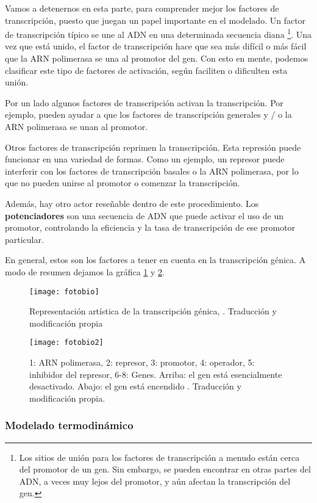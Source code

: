  Vamos a detenernos en esta parte, para comprender mejor los factores de transcripción, puesto que juegan un papel importante en el modelado.
  Un factor de transcripción típico se une al ADN en una determinada secuencia diana \footnote{Los sitios de unión para los factores de transcripción a menudo están cerca del promotor de un gen. Sin embargo, se pueden encontrar en otras partes del ADN, a veces muy lejos del promotor, y aún afectan la transcripción del gen.}. Una vez que está unido, el factor de transcripción hace que sea más difícil o más fácil que la ARN polimerasa se una al promotor del gen. Con esto en mente, podemos clasificar este tipo de factores de activación, según faciliten o dificulten esta unión.
 
 Por un lado algunos factores de transcripción activan la transcripción. Por ejemplo, pueden ayudar a que los factores de transcripción generales y / o la ARN polimerasa se unan al promotor.
 
 Otros factores de transcripción reprimen la transcripción. Esta represión puede funcionar en una variedad de formas. Como un ejemplo, un represor puede interferir con los factores de transcripción basales o la ARN polimerasa, por lo que no pueden unirse al promotor o comenzar la transcripción.
 
 Además, hay otro actor reseñable dentro de este procedimiento. Los \textbf{potenciadores} son una secuencia de ADN que puede activar el uso de un promotor, controlando la eficiencia y la tasa de transcripción de ese promotor particular.
 
 En general, estos son los factores a tener en cuenta en la transcripción génica. A modo de resumen dejamos la gráfica \ref{biologiafoto} y \ref{biofoto2}.
   \begin{figure}[h]
 	\texttt{[image: fotobio]}
 	\centering
 	\caption{Representación artística de la transcripción génica, \cite{wiki:foto_ts}. Traducción y modificación propia}
 	\label{biologiafoto}
 \end{figure}
    \begin{figure}[h]
 	\texttt{[image: fotobio2]}
 	\centering
 	\caption{1: ARN polimerasa, 2: represor, 3: promotor, 4: operador, 5: inhibidor del represor, 6-8: Genes. Arriba: el gen está esencialmente desactivado. Abajo: el gen está encendido \cite{wiki:foto_pro}. Traducción y modificación propia.}
 	\label{biofoto2}
 \end{figure}
 
 \subsubsection{Modelado termodinámico}
 
